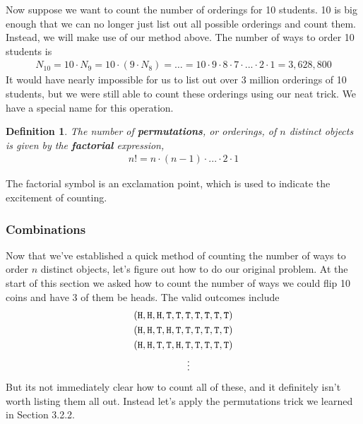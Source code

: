 \documentclass[11pt,letterpaper]{article}
\newcommand\hd{\texttt{H}}
\newcommand\tl{\texttt{T}}
\numberwithin{theorem}{section}
\newtheorem{definition}[theorem]{Definition}
\numberwithin{definition}{section}
\numberwithin{lemma}{section}
\numberwithin{corollary}{section}
\numberwithin{proposition}{section}
\theoremstyle{definition}
\numberwithin{remark}{section}
\numberwithin{claim}{section}
\numberwithin{observation}{section}
\numberwithin{fact}{section}
\numberwithin{assumption}{section}
\numberwithin{example}{section}
\numberwithin{exercise}{section}
\begin{document}
Now suppose we want to count the number of orderings for 10 students. 10 is big enough that we can no longer just list out all possible orderings and count them. Instead, we will make use of our method above. The number of ways to order 10 students is
\begin{align*}
N_{10} = 10 \cdot N_9 = 10 \cdot (9 \cdot N_8) = \dots = 10 \cdot 9 \cdot 8 \cdot 7 \cdot ... \cdot 2 \cdot 1 = 3,628,800
\end{align*}
It would have nearly impossible for us to list out over 3 million orderings of 10 students, but we were still able to count these orderings using our neat trick. We have a special name for this operation.

\begin{definition}
The number of \textbf{permutations}, or orderings, of $n$ distinct objects is given by the \textbf{factorial} expression,
\begin{align*}
n! = n\cdot (n-1) \cdot ... \cdot 2 \cdot 1
\end{align*}
\end{definition}
The factorial symbol is an exclamation point, which is used to indicate the excitement of counting.

\subsubsection{Combinations}
Now that we've established a quick method of counting the number of ways to order $n$ distinct objects, let's figure out how to do our original problem. At the start of this section we asked how to count the number of ways we could flip 10 coins and have 3 of them be heads. The valid outcomes include
\begin{align*}
&(\hd,\hd,\hd,\tl,\tl,\tl,\tl,\tl,\tl,\tl) \\
&(\hd,\hd,\tl,\hd,\tl,\tl,\tl,\tl,\tl,\tl) \\
&(\hd,\hd,\tl,\tl,\hd,\tl,\tl,\tl,\tl,\tl) \\
&\hspace{1.9cm}\vdots
\end{align*}
But its not immediately clear how to count all of these, and it definitely isn't worth listing them all out. Instead let's apply the permutations trick we learned in Section 3.2.2.
\end{document}
